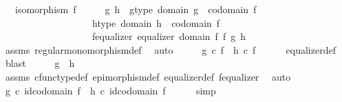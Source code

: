 \begin{isabellebody}
\ \ \ {\isachardoublequoteopen}isomorphism\ f{\isachardoublequoteclose}\isanewline
%
\isadelimproof
%
\endisadelimproof
%
\isatagproof
{}\isamarkupfalse%
\ {\isacharminus}{\kern0pt}\isanewline
\ \ \isamarkupfalse%
\ g\ h\ \ g{\isacharunderscore}{\kern0pt}type{\isacharcolon}{\kern0pt}\ {\isachardoublequoteopen}domain\ g\ {\isacharequal}{\kern0pt}\ codomain\ f{\isachardoublequoteclose}\ \isanewline
\ \ \ \ \ \ \ \ \ \ \ \ \ \ \ \ \ \ \ h{\isacharunderscore}{\kern0pt}type{\isacharcolon}{\kern0pt}\ {\isachardoublequoteopen}domain\ h\ {\isacharequal}{\kern0pt}\ codomain\ f{\isachardoublequoteclose}\ \isanewline
\ \ \ \ \ \ \ \ \ \ \ \ \ \ \ \ \ \ \ f{\isacharunderscore}{\kern0pt}equalizer{\isacharcolon}{\kern0pt}\ {\isachardoublequoteopen}equalizer\ {\isacharparenleft}{\kern0pt}domain\ f{\isacharparenright}{\kern0pt}\ f\ g\ h{\isachardoublequoteclose}\isanewline
\ \ \ \ \isamarkupfalse%
\ assms{\isacharparenleft}{\kern0pt}{}{\isacharparenright}{\kern0pt}\ regular{\isacharunderscore}{\kern0pt}monomorphism{\isacharunderscore}{\kern0pt}def\ \isamarkupfalse%
\ auto\isanewline
\ \ \isamarkupfalse%
\ \isamarkupfalse%
\ {\isachardoublequoteopen}g\ {\isasymcirc}\isactrlsub c\ f\ {\isacharequal}{\kern0pt}\ h\ {\isasymcirc}\isactrlsub c\ f{\isachardoublequoteclose}\isanewline
\ \ \ \ \isamarkupfalse%
\ equalizer{\isacharunderscore}{\kern0pt}def\ \isamarkupfalse%
\ blast\isanewline
\ \ \isamarkupfalse%
\ \isamarkupfalse%
\ {\isachardoublequoteopen}g\ {\isacharequal}{\kern0pt}\ h{\isachardoublequoteclose}\isanewline
\ \ \ \ \isamarkupfalse%
\ assms{\isacharparenleft}{\kern0pt}{}{\isacharparenright}{\kern0pt}\ cfunc{\isacharunderscore}{\kern0pt}type{\isacharunderscore}{\kern0pt}def\ epimorphism{\isacharunderscore}{\kern0pt}def\ equalizer{\isacharunderscore}{\kern0pt}def\ f{\isacharunderscore}{\kern0pt}equalizer\ \isamarkupfalse%
\ auto\isanewline
\ \ \isamarkupfalse%
\ \isamarkupfalse%
\ {\isachardoublequoteopen}g\ {\isasymcirc}\isactrlsub c\ id{\isacharparenleft}{\kern0pt}codomain\ f{\isacharparenright}{\kern0pt}\ {\isacharequal}{\kern0pt}\ h\ {\isasymcirc}\isactrlsub c\ id{\isacharparenleft}{\kern0pt}codomain\ f{\isacharparenright}{\kern0pt}{\isachardoublequoteclose}\isanewline
\ \ \ \ \isamarkupfalse%
\ simp\isanewline
\ \ \isamarkupfalse%

\end{isabellebody}

